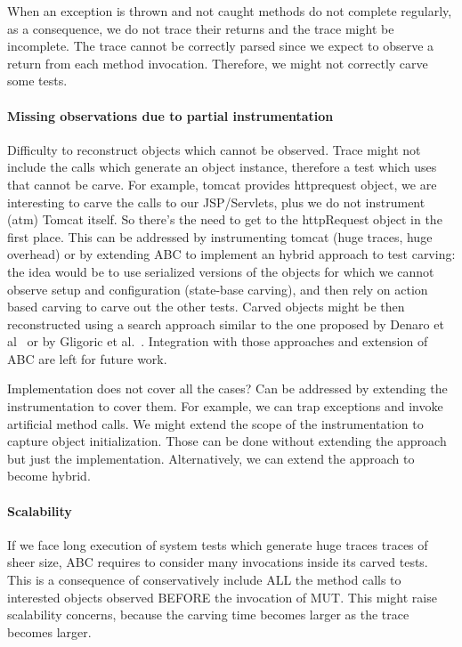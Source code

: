 \documentclass[10pt,conference]{IEEEtran}
\newcommand{\abc}{\textsf{ABC}\xspace}
\begin{document}
When an exception is thrown and not caught methods do not complete regularly, as a consequence, we do not trace their returns and the trace might be incomplete. The trace cannot be correctly parsed since we expect to observe a return from each method invocation.  Therefore, we might not correctly carve some tests.

\paragraph{Missing observations due to partial instrumentation}
Difficulty to reconstruct objects which cannot be observed. Trace might not include the calls which generate an object instance, therefore a test which uses that cannot be carve. For example, tomcat provides httprequest object, we are interesting to carve the calls to our JSP/Servlets, plus we do not instrument (atm) Tomcat itself. So there's the need to get to the httpRequest object in the first place. This can be addressed by instrumenting tomcat (huge traces, huge overhead) or by extending \abc to implement an hybrid approach to test carving: the idea would be to use serialized versions of the objects for which we cannot observe setup and configuration (state-base carving), and then rely on action based carving to carve out the other tests. Carved objects might be then reconstructed using a search approach similar to the one proposed by Denaro et al~\cite{} or by Gligoric et al.~\cite{}. Integration with those approaches and extension of \abc are left for future work.

Implementation does not cover all the cases? Can be addressed by extending the instrumentation to cover them.
For example, we can trap exceptions and invoke artificial method calls. We might extend the scope of the instrumentation to capture object initialization. Those can be done without extending the approach but just the implementation. Alternatively, we can extend the approach to become hybrid.

\paragraph{Scalability}
If we face long execution of system tests which generate huge traces traces of sheer size, \abc requires to consider many invocations inside its carved  tests. This is a consequence of conservatively include ALL the method calls to interested objects observed BEFORE the invocation of MUT.
This might raise scalability concerns, because the carving time becomes larger as the trace becomes larger.
\end{document}

